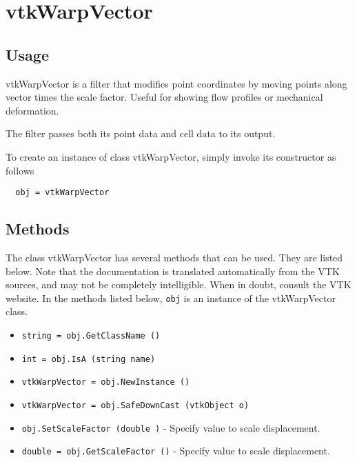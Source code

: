 \section{vtkWarpVector}

\subsection{Usage}

 vtkWarpVector is a filter that modifies point coordinates by moving
 points along vector times the scale factor. Useful for showing flow
 profiles or mechanical deformation.

 The filter passes both its point data and cell data to its output.

To create an instance of class vtkWarpVector, simply
invoke its constructor as follows
\begin{verbatim}
  obj = vtkWarpVector
\end{verbatim}
\subsection{Methods}

The class vtkWarpVector has several methods that can be used.
  They are listed below.
Note that the documentation is translated automatically from the VTK sources,
and may not be completely intelligible.  When in doubt, consult the VTK website.
In the methods listed below, \verb|obj| is an instance of the vtkWarpVector class.
\begin{itemize}
\item  \verb|string = obj.GetClassName ()|

\item  \verb|int = obj.IsA (string name)|

\item  \verb|vtkWarpVector = obj.NewInstance ()|

\item  \verb|vtkWarpVector = obj.SafeDownCast (vtkObject o)|

\item  \verb|obj.SetScaleFactor (double )| -  Specify value to scale displacement.

\item  \verb|double = obj.GetScaleFactor ()| -  Specify value to scale displacement.

\end{itemize}
